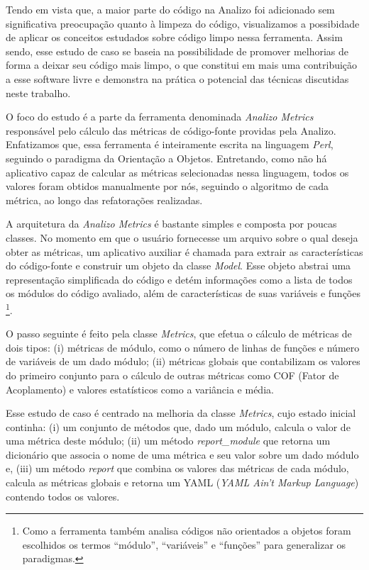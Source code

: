 Tendo em vista que, a maior parte do código na Analizo foi adicionado sem significativa
preocupação quanto à limpeza do código, visualizamos a possibidade de aplicar os conceitos
estudados sobre código limpo nessa ferramenta. Assim sendo, esse estudo de caso se baseia na
possibilidade de promover melhorias de forma a deixar seu código mais limpo, o que constitui
em mais uma contribuição a esse software livre e demonstra na prática o
potencial das técnicas discutidas neste trabalho.

O foco do estudo é a parte da ferramenta denominada \textit{Analizo Metrics} responsável
pelo cálculo das métricas de código-fonte providas pela Analizo. Enfatizamos que,
essa ferramenta é inteiramente escrita na linguagem \textit{Perl}, seguindo o paradigma da
Orientação a Objetos. Entretando, como não há aplicativo capaz de calcular as métricas selecionadas
nessa linguagem, todos os valores foram obtidos manualmente por nós, seguindo o algoritmo
de cada métrica, ao longo das refatorações realizadas.

A arquitetura da \textit{Analizo Metrics} é bastante simples e composta por poucas classes.
No momento em que o usuário fornecesse um arquivo sobre o qual deseja obter as métricas, um aplicativo
auxiliar é chamada para extrair as características do código-fonte e construir um objeto da
classe \textit{Model}. Esse objeto abstrai uma representação simplificada do código e detém 
informações como a lista de todos os módulos do código avaliado, além de características
de suas variáveis e funções \footnote{Como a ferramenta também analisa códigos não orientados
a objetos foram escolhidos os termos ``módulo'', ``variáveis'' e ``funções'' para generalizar os 
paradigmas.}.

O passo seguinte é feito pela classe \textit{Metrics}, que efetua o cálculo de métricas de dois 
tipos: (i) métricas de módulo, como o número de linhas de funções e número de variáveis de
um dado módulo; (ii) métricas globais que contabilizam os valores do primeiro conjunto para o
cálculo de outras métricas como COF (Fator de Acoplamento) e valores estatísticos como a variância e 
média.

Esse estudo de caso é centrado na melhoria da classe \textit{Metrics}, cujo estado inicial continha:
(i) um conjunto de métodos que, dado um módulo, calcula o valor de uma métrica deste módulo;
(ii) um método \textit{report\_module} que retorna um dicionário que associa o nome de uma métrica
e seu valor sobre um dado módulo e,  (iii) um método \textit{report} que combina os valores das métricas
de cada módulo, calcula as métricas globais e retorna um YAML (\textit{YAML Ain’t Markup Language}) 
contendo todos os valores.

